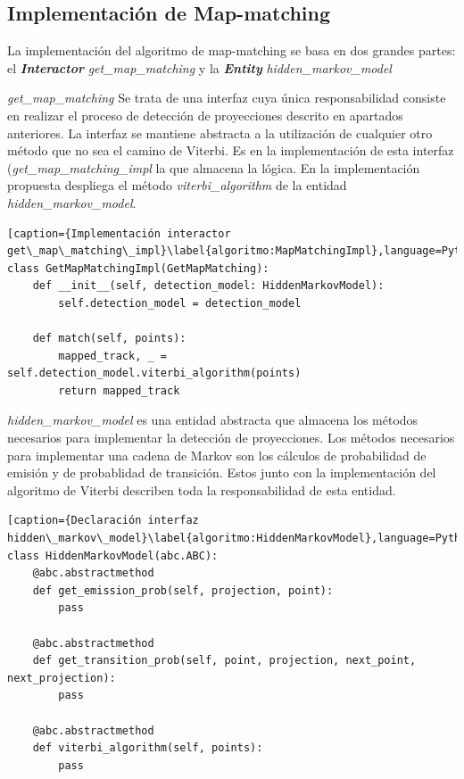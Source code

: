 \clearpage


\subsection{Implementación de Map-matching}
La implementación del algoritmo de map-matching se basa en dos grandes partes: 
el \textbf{\textit{Interactor}} \textit{get\_map\_matching} y la \textbf{\textit{Entity}} 
\textit{hidden\_markov\_model}

\textit{get\_map\_matching} Se trata de una interfaz cuya única responsabilidad consiste en realizar 
el proceso de detección de proyecciones descrito en apartados anteriores. La interfaz se mantiene 
abstracta a la utilización de cualquier otro método que no sea el camino de Viterbi. Es en la implementación 
de esta interfaz (\textit{get\_map\_matching\_impl} la que almacena la lógica. En la implementación propuesta despliega el método \textit{viterbi\_algorithm} de la entidad \textit{hidden\_markov\_model}.

\begin{lstlisting}[caption={Implementación interactor get\_map\_matching\_impl}\label{algoritmo:MapMatchingImpl},language=Python] 
class GetMapMatchingImpl(GetMapMatching):
    def __init__(self, detection_model: HiddenMarkovModel):
        self.detection_model = detection_model

    def match(self, points):
        mapped_track, _ = self.detection_model.viterbi_algorithm(points)
        return mapped_track

\end{lstlisting}

\textit{hidden\_markov\_model} es una entidad abstracta que almacena los métodos necesarios para 
implementar la detección de proyecciones. Los métodos necesarios para implementar una cadena de 
Markov son los cálculos de probabilidad de emisión y de probablidad de transición. Estos junto con la 
implementación del algoritmo de Viterbi describen toda la responsabilidad de esta entidad.

\begin{lstlisting}[caption={Declaración interfaz hidden\_markov\_model}\label{algoritmo:HiddenMarkovModel},language=Python] 
class HiddenMarkovModel(abc.ABC):
    @abc.abstractmethod
    def get_emission_prob(self, projection, point):
        pass

    @abc.abstractmethod
    def get_transition_prob(self, point, projection, next_point, next_projection):
        pass

    @abc.abstractmethod
    def viterbi_algorithm(self, points):
        pass
\end{lstlisting}



